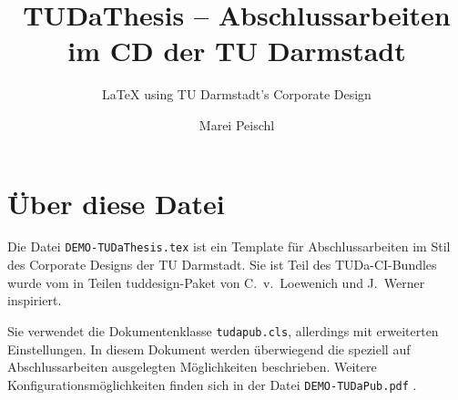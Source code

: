 \documentclass[
	ngerman,
	ruledheaders=section,%
	class=report,%
	thesis={type=bachelor},%
	accentcolor=9c,%
	custommargins=true,%
	marginpar=false,%
	parskip=half-,%
	fontsize=11pt,%
]{tudapub}
\let\file\texttt
\begin{document}

\title{TUDaThesis -- Abschlussarbeiten im CD der TU Darmstadt}
\subtitle{\LaTeX{} using TU Darmstadt's Corporate Design}
\author[M. Peischl]{Marei Peischl}%


\submissiondate{\today}
\examdate{\today}



\maketitle

\affidavit%

\tableofcontents


\chapter{Über diese Datei}
Die Datei \file{DEMO-TUDaThesis.tex} ist ein Template für Abschlussarbeiten im Stil des Corporate Designs der TU Darmstadt.
Sie ist Teil des TUDa-CI-Bundles wurde vom in Teilen tuddesign-Paket von C.~v.~Loewenich und J.~Werner inspiriert.

Sie verwendet die Dokumentenklasse \file{tudapub.cls}, allerdings mit erweiterten Einstellungen. In diesem Dokument werden überwiegend die speziell auf Abschlussarbeiten ausgelegten Möglichkeiten beschrieben. Weitere Konfigurationsmöglichkeiten finden sich in der Datei \file{DEMO-TUDaPub.pdf} \cite{tudapub}.
\end{document}
